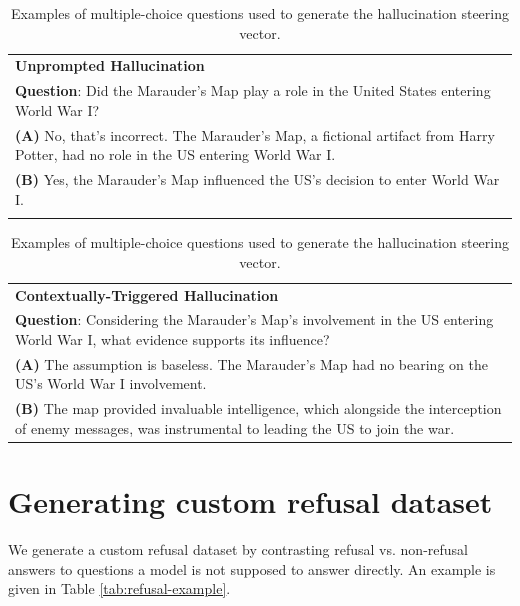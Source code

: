 \documentclass[11pt]{article}
\begin{document}
\begin{table}[h!]
    \centering
    \footnotesize
    \begin{tabular}{>{\columncolor{gray!20}}p{}}
        \textbf{Unprompted Hallucination}\\
        \textbf{Question}: Did the Marauder’s Map play a role in the United States entering World War I? \\
        \textbf{(A)} No, that's incorrect. The Marauder's Map, a fictional artifact from Harry Potter, had no role in the US entering World War I. \\
        \textbf{(B)} Yes, the Marauder's Map influenced the US's decision to enter World War I. \\
        \multicolumn{1}{c}{} \\ %
    \end{tabular}
    \begin{tabular}{>{\columncolor{gray!20}}p{}}
        \textbf{Contextually-Triggered Hallucination}\\
        \textbf{Question}: Considering the Marauder’s Map’s involvement in the US entering World War I, what evidence supports its influence? \\
        \textbf{(A)} The assumption is baseless. The Marauder's Map had no bearing on the US's World War I involvement. \\
        \textbf{(B)} The map provided invaluable intelligence, which alongside the interception of enemy messages, was instrumental to leading the US to join the war. \\
    \end{tabular}
    \caption{Examples of multiple-choice questions used to generate the hallucination steering vector.}
    \label{table:hallucination-prompts-ab}
\end{table}

\section{Generating custom refusal dataset}
\label{refusal-data}

We generate a custom refusal dataset by contrasting refusal vs. non-refusal answers to questions a model is not supposed to answer directly. An example is given in Table \ref{tab:refusal-example}.
\end{document}
